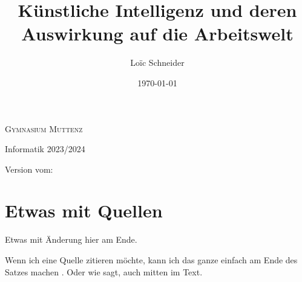 \documentclass{report}
\title{Künstliche Intelligenz und deren Auswirkung auf die Arbeitswelt}
\author{Loïc Schneider}
\date{\today}
\begin{document}
\begin{titlepage}
    \makeatletter %
	\begin{center}
		{\scshape Gymnasium Muttenz} \vspace{0.5cm}

		 Informatik 2023/2024\vspace{5.5cm}

		{\huge\bfseries \@title}

		\vspace{2cm}

		{\Large\itshape \@author}

        \vspace{2cm}

        Version vom: \@date
	\end{center}
    
    \makeatother %
\end{titlepage}

\tableofcontents







\section{Etwas mit Quellen}

Etwas mit Änderung hier am Ende.

Wenn ich eine Quelle zitieren möchte, kann ich das ganze einfach am Ende des Satzes machen \citep{example}. Oder wie \citet{example} sagt, auch mitten im Text.

\printbibliography
\end{document}

